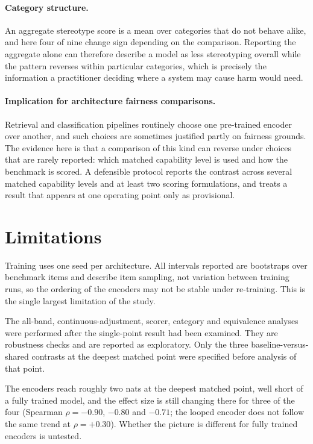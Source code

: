 \documentclass[sigconf,natbib=true,anonymous=true]{acmart}
\begin{document}
\paragraph{Category structure.}
An aggregate stereotype score is a mean over categories that do not behave alike,
and here four of nine change sign depending on the comparison. Reporting the
aggregate alone can therefore describe a model as less stereotyping overall while
the pattern reverses within particular categories, which is precisely the
information a practitioner deciding where a system may cause harm would need.

\paragraph{Implication for architecture fairness comparisons.}
Retrieval and classification pipelines routinely choose one pre-trained encoder
over another, and such choices are sometimes justified partly on fairness
grounds. The evidence here is that a comparison of this kind can reverse under
choices that are rarely reported: which matched capability level is used and how
the benchmark is scored. A defensible protocol reports the contrast across
several matched capability levels and at least two scoring formulations, and
treats a result that appears at one operating point only as provisional.

\section{Limitations}
\label{sec:limits}

Training uses one seed per architecture. All intervals reported are bootstraps
over benchmark items and describe item sampling, not variation between training
runs, so the ordering of the encoders may not be stable under re-training. This
is the single largest limitation of the study.

The all-band, continuous-adjustment, scorer, category and equivalence analyses
were performed after the single-point result had been examined. They are
robustness checks and are reported as exploratory. Only the three
baseline-versus-shared contrasts at the deepest matched point were specified
before analysis of that point.

The encoders reach roughly two nats at the deepest matched point, well short of a
fully trained model, and the effect size is still changing there for three of the
four (Spearman $\rho = -0.90$, $-0.80$ and $-0.71$; the looped encoder does not
follow the same trend at $\rho = +0.30$). Whether the picture is different for
fully trained encoders is untested.
\end{document}
